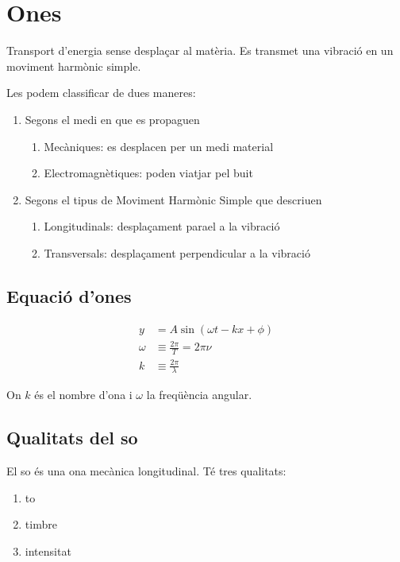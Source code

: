 \section{Ones}
\label{sec:ones}

Transport d'energia sense desplaçar al matèria. Es transmet una vibració en un
moviment harmònic simple.

Les podem classificar de dues maneres:
\begin{enumerate}
\item Segons el medi en que es propaguen
    \begin{enumerate}
        \item Mecàniques: es desplacen per un medi material
        \item Electromagnètiques: poden viatjar pel buit
    \end{enumerate}
\item Segons el tipus de Moviment Harmònic Simple que descriuen
    \begin{enumerate}
        \item Longitudinals: desplaçament para\lgem el a la vibració
        \item Transversals: desplaçament perpendicular a la vibració
    \end{enumerate}
\end{enumerate}

\subsection{Equació d'ones}
\label{sub:equacio_d_ones}

\begin{align}
    y &= A \sin \left( \omega t - k x + \phi \right)\\
    \omega &\equiv \frac{2\pi}{T} = 2\pi \nu \\
    k &\equiv \frac{2\pi}{\lambda}
\end{align}

On $k$ és el nombre d'ona i $\omega$ la freqüència angular.

\subsection{Qualitats del so}
\label{sub:qualitats_del_so}

El so és una ona mecànica longitudinal. Té tres qualitats:

\begin{enumerate}
    \item to
    \item timbre
    \item intensitat
\end{enumerate}


